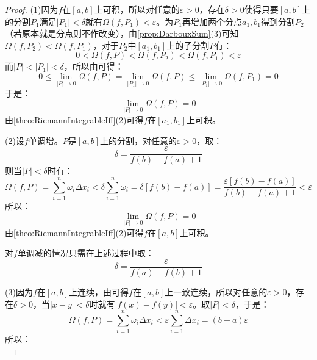 \begin{proof}
	(1)因为$f$在$[a,b]$上可积，所以对任意的$\varepsilon>0$，存在$\delta>0$使得只要$[a,b]$上的分割$P_1$满足$|P_1|<\delta$就有$\Omega(f,P_1)<\varepsilon$。为$P_1$再增加两个分点$a_1,b_1$得到分割$P_2$（若原本就是分点则不作改变），由\cref{prop:DarbouxSum}(3)可知$\Omega(f,P_2)<\Omega(f,P_1)$，对于$P_2$中$[a_1,b_1]$上的子分割$P$有：
	\begin{equation*}
		0<\Omega(f,P)<\Omega(f,P_2)<\Omega(f,P_1)<\varepsilon
	\end{equation*}
	而$|P|<|P_1|<\delta$，所以由可得：
	\begin{equation*}
		0\leqslant\lim_{|P|\to0}\Omega(f,P)=\lim_{|P_1|\to0}\Omega(f,P)\leqslant\lim_{|P_1|\to0}\Omega(f,P_1)=0
	\end{equation*}
	于是：
	\begin{equation*}
		\lim_{|P|\to0}\Omega(f,P)=0
	\end{equation*}
	由\cref{theo:RiemannIntegrableIff}(2)可得$f$在$[a_1,b_1]$上可积。\par
	(2)设$f$单调增。$P$是$[a,b]$上的分割，对任意的$\varepsilon>0$，取：
	\begin{equation*}
		\delta=\frac{\varepsilon}{f(b)-f(a)+1}
	\end{equation*}
	则当$|P|<\delta$时有：
	\begin{equation*}
		\Omega(f,P)=\sum_{i=1}^{n}\omega_i\Delta x_i<\delta\sum_{i=1}^{n}\omega_i=\delta[f(b)-f(a)]=\frac{\varepsilon[f(b)-f(a)]}{f(b)-f(a)+1}<\varepsilon
	\end{equation*}
	所以：
	\begin{equation*}
		\lim_{|P|\to0}\Omega(f,P)=0
	\end{equation*}
	由\cref{theo:RiemannIntegrableIff}(2)可得$f$在$[a,b]$上可积。\par
	对$f$单调减的情况只需在上述过程中取：
	\begin{equation*}
		\delta=\frac{\varepsilon}{f(a)-f(b)+1}
	\end{equation*}\par
	(3)因为$f$在$[a,b]$上连续，由可得$f$在$[a,b]$上一致连续，所以对任意的$\varepsilon>0$，存在$\delta>0$，当$|x-y|<\delta$时就有$|f(x)-f(y)|<\varepsilon$。取$|P|<\delta$，于是：
	\begin{equation*}
		\Omega(f,P)=\sum_{i=1}^{n}\omega_i\Delta x_i<\varepsilon\sum_{i=1}^{n}\Delta x_i=(b-a)\varepsilon
	\end{equation*}
	所以：
	\begin{equation*}

\end{equation*}
\end{proof}

